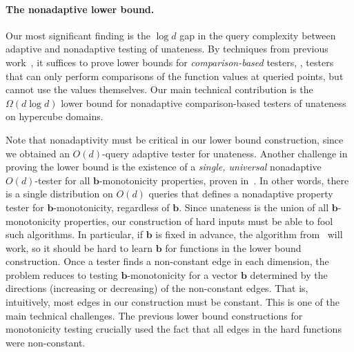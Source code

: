 \documentclass{toc}
\newcommand{\bb}{\ensuremath{\mathbf{b}}}
\begin{document}
\paragraph{The nonadaptive lower bound.} Our most significant finding
is the $\log d$ gap in the query complexity between adaptive and
nonadaptive testing of unateness.  By techniques from previous
work~\cite{Fis04,CS14}, it suffices to prove lower bounds for
\emph{comparison-based} testers, \ie, testers that can only perform
comparisons of the function values at queried points, but cannot use
the values themselves.  Our main technical contribution is the
$\Omega(d\log d)$ lower bound for nonadaptive comparison-based testers
of unateness on hypercube domains.

Note that nonadaptivity must be critical in our lower bound construction, since
we obtained 
%
%
an 
%
$O(d)$-query adaptive tester for unateness.
%
%
%
%
Another challenge in proving the lower bound is the existence of a \emph{single, universal} nonadaptive
$O(d)$-tester for all
$\bb$-monotonicity properties, proven in~\cite{CDJS17}. In other words, there is a single
distribution on  $O(d)$ queries that defines a nonadaptive property tester for
$\bb$-monotonicity, regardless of $\bb$.
Since unateness
is the union of all $\bb$-monotonicity properties,
our construction of hard inputs must be able to fool such algorithms. In particular, if $\bb$ is fixed in advance, the algorithm from~\cite{CDJS17} will work, so it should be hard to learn $\bb$ for functions in the lower bound construction.
Once a tester finds a non-constant edge in each dimension, the problem reduces to testing $\bb$-monotonicity for a vector $\bb$ determined by the directions (increasing or decreasing) of the non-constant edges. That is, intuitively, most edges in our construction must be constant. This is one of the main technical challenges. The previous lower bound constructions for monotonicity testing \cite{BBM12,CS14} crucially used the fact that all edges in the hard functions were non-constant.
\end{document}
